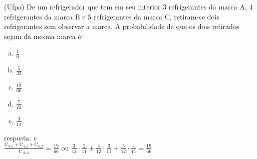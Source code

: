 \begin{ex}
(Ufpa) De um refrigerador que tem em seu interior 3 refrigerantes da marca A, 4 refrigerantes da marca B e 5 refrigerantes da marca C, retiram-se dois refrigerantes sem observar a marca. A probabilidade de que os dois retirados sejam da mesma marca é:
   \begin{enumerate}[(a)]
   \item $\frac{1}{6}$
   \item $\frac{5}{33}$
   \item $\frac{19}{66}$
   \item $\frac{7}{22}$
   \item $\frac{3}{11} $
   \end{enumerate}
     \begin{sol}
      resposta: c \\
      $\frac{\mathrm{C}_{3,2}+\mathrm{C}_{4,2}+\mathrm{C}_{5,2}}{\mathrm{C}_{{12},2}}=\frac{19}{66}$ \hspace{0,2cm} ou \hspace{0,2cm}
      $\frac{3}{12}\cdot \frac{2}{11}+\frac{4}{12}\cdot \frac{3}{11}+\frac{5}{12}\cdot \frac{4}{11}= \frac{19}{66}$
     \end{sol}
\end{ex}